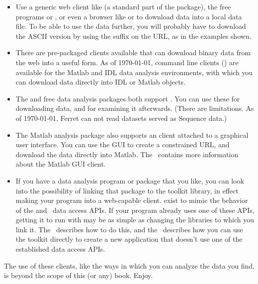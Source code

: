 \documentclass{dods-book}
\begin{document}
\begin{itemize}
\item Use a generic web client like  (a standard part of
  the \opendap package), the free programs
  or , or even a browser
  like  or  to download
  data into a local data file.  To be able to use the data further,
  you will probably have to download the ASCII version by using the
   suffix on the URL, as in the examples shown.
\item There are pre-packaged \opendap clients available that can download
  binary \opendap data from the web into a useful form.  As of \today ,
  command line clients () are available for the Matlab
  and IDL data analysis environments, with which you can download \opendap
  data directly into IDL or Matlab objects.  
\item The  and 
  free data analysis packages both support \opendap.  You can use these
  for downloading \opendap data, and for examining it afterwards.  (There
  are limitations.  As of \today , Ferret can not read datasets served
  as Sequence data.)
\item The Matlab analysis package also supports an \opendap client attached
  to a graphical user interface.  You can use the GUI to create a
  constrained \opendap URL, and download the data directly into Matlab.
  The \OPDmgui\ contains more information about the Matlab GUI
  client.
\item If you have a data analysis program or package that you like,
  you can look into the possibility of linking that package to the
  \opendap toolkit library, in effect making your program into a
  web-capable \opendap client.  
   exist to mimic the behavior of the
  \netcdf and \jgofs\ data access APIs.  If your program already uses
  one of these APIs, getting it to run with \opendap may be as simple as
  changing the libraries to which you link it.  The \OPDuser\ 
  describes how to do this, and the \OPDapi\ describes how you can
  use the \opendap toolkit directly to create a new application that
  doesn't use one of the established data access
  APIs.

\end{itemize}

The use of these clients, like the ways in which you can analyze the
data you find, is beyond the scope of this (or any) book.  Enjoy.

\printindex
\end{document}
